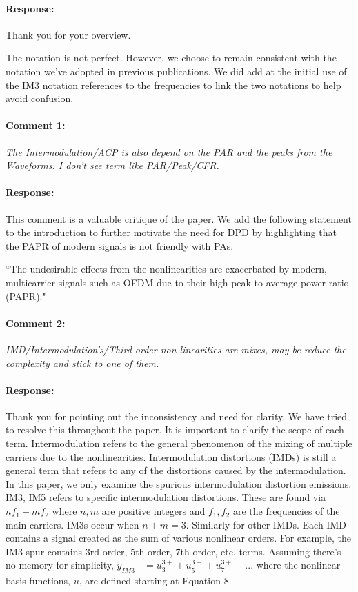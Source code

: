 \documentclass[]{article}
\begin{document}
\paragraph{Response:}
Thank you for your overview. 

The notation is not perfect. However, we choose to remain consistent with the notation we've adopted in previous publications. We did add at the initial use of the IM3 notation references to the frequencies to link the two notations to help avoid confusion. 


\paragraph{Comment 1:}\textit{The Intermodulation/ACP is also depend on the PAR and the peaks from the Waveforms. I don't see term like PAR/Peak/CFR.}

\paragraph{Response:}
This comment is a valuable critique of the paper. We add the following statement to the introduction to further motivate the need for DPD by highlighting that the PAPR of modern signals is not friendly with PAs. 
 
{\color{red}``The undesirable effects from the nonlinearities are exacerbated by modern, multicarrier signals such as OFDM due to their high peak-to-average power ratio (PAPR)."}

\paragraph{Comment 2:}\textit{IMD/Intermodulation's/Third order non-linearities are mixes, may be reduce the complexity and stick to one of them.}
\paragraph{Response:}
Thank you for pointing out the inconsistency and need for clarity. We have tried to resolve this throughout the paper. It is important to clarify the scope of each term. Intermodulation refers to the general phenomenon of the mixing of multiple carriers due to the nonlinearities. Intermodulation distortions (IMDs) is still a general term that refers to any of the distortions caused by the intermodulation. In this paper, we only examine the spurious intermodulation distortion emissions. IM3, IM5 refers to specific intermodulation distortions. These are found via $n f_1 - m f_2$ where $n,m$ are positive integers and $f_1, f_2$ are the frequencies of the main carriers. IM3s occur when $n+m = 3$. Similarly for other IMDs. Each IMD contains a signal created as the sum of various nonlinear orders. For example, the IM3 spur contains 3rd order, 5th order, 7th order, etc. terms. Assuming there's no memory for simplicity, $y_{IM3+} = u_3^{3+} + u_5^{3+} + u_7^{3+} + ...$ where the nonlinear basis functions, $u$, are defined starting at Equation 8.
\end{document}
